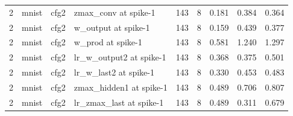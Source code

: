 \begin{table}[htbp]
{\begin{tabular}{@{}rlllrrrrr@{}}
2 & mnist & cfg2 & zmax\_conv at spike-1 & 143 & 8 & 0.181 & 0.384 & 0.364 \\
2 & mnist & cfg2 & w\_output at spike-1 & 143 & 8 & 0.159 & 0.439 & 0.377 \\
2 & mnist & cfg2 & w\_prod at spike-1 & 143 & 8 & 0.581 & 1.240 & 1.297 \\
2 & mnist & cfg2 & lr\_w\_output2 at spike-1 & 143 & 8 & 0.368 & 0.375 & 0.501 \\
2 & mnist & cfg2 & lr\_w\_last2 at spike-1 & 143 & 8 & 0.330 & 0.453 & 0.483 \\
2 & mnist & cfg2 & zmax\_hidden1 at spike-1 & 143 & 8 & 0.489 & 0.706 & 0.807 \\
2 & mnist & cfg2 & lr\_zmax\_last at spike-1 & 143 & 8 & 0.489 & 0.311 & 0.679 \\
\bottomrule
\end{tabular}}
\end{table}
